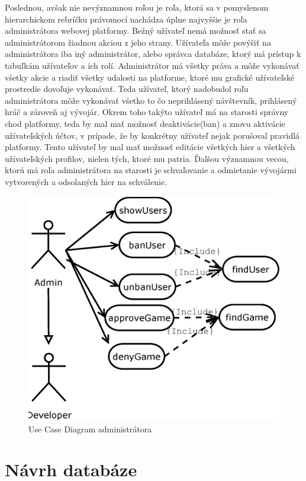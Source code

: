 Poslednou, avšak nie nevýznamnou roľou je roľa, ktorá sa v pomyslenom hierarchickom rebríčku právomocí nachádza úplne najvyššie je roľa administrátora webovej platformy. Bežný užívateľ nemá možnosť stať sa administrátorom žiadnou akciou z jeho strany. Užívateľa môže povýšiť na administrátora iba iný administrátor, alebo správca databáze, ktorý má prístup k tabuľkám užívateľov a ich rolí. Administrátor má všetky práva a môže vykonávať všetky akcie a riadiť všetky udalosti na platforme, ktoré mu grafické užívateľské prostredie dovoľuje vykonávať. Teda užívateľ, ktorý nadobudol roľu administrátora môže vykonávať všetko to čo neprihlásený návštevník, prihlásený hráč a zároveň aj vývojár. Okrem toho takýto užívateľ má na starosti správny chod platformy, teda by mal mať možnosť deaktivácie(ban) a znovu aktivácie užívateľských účtov, v prípade, že by konkrétny užívateľ nejak porušoval pravidlá platformy. Tento užívateľ by mal mať možnosť editácie všetkých hier a všetkých užívateľských profilov, nielen tých, ktoré mu patria. Ďalšou významnou vecou, ktorú má roľa administrátora na starosti je schvaľovanie a odmietanie vývojármi vytvorených a odsolaných hier na schválenie. 
\begin{figure}[h]
  \centering
  \includegraphics[scale=0.4]{fig/ucd-admin.eps}
  \caption{Use Case Diagram administrátora}
  \label{fig:ucdadmin}
\end{figure}

\section{Návrh databáze}


